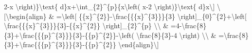 2-x \textbackslash right)\}\textbackslash text\{ d\}x+\textbackslash int\_\{2\}\textasciicircum\{p\}\{x\textbackslash left(
x-2 \textbackslash right)\}\textbackslash text\{ d\}x\textbackslash{]}
\textbackslash{[}\textbackslash begin\{align\} \& =\textbackslash left{[}
\{\{x\}\textasciicircum\{2\}\}-\textbackslash frac\{\{\{x\}\textasciicircum\{3\}\}\}\{3\}
\textbackslash right{]}\_\{0\}\textasciicircum\{2\}+\textbackslash left{[}
\textbackslash frac\{\{\{x\}\textasciicircum\{3\}\}\}\{3\}-\{\{x\}\textasciicircum\{2\}\}
\textbackslash right{]}\_\{2\}\textasciicircum\{p\} \textbackslash\textbackslash{}
\& =4-\textbackslash frac\{8\}\{3\}+\textbackslash frac\{\{\{p\}\textasciicircum\{3\}\}\}\{3\}-\{\{p\}\textasciicircum\{2\}\}-\textbackslash left(
\textbackslash frac\{8\}\{3\}-4 \textbackslash right) \textbackslash\textbackslash{}
\& =\textbackslash frac\{8\}\{3\}+\textbackslash frac\{\{\{p\}\textasciicircum\{3\}\}\}\{3\}-\{\{p\}\textasciicircum\{2\}\}
\textbackslash end\{align\}\textbackslash{]}